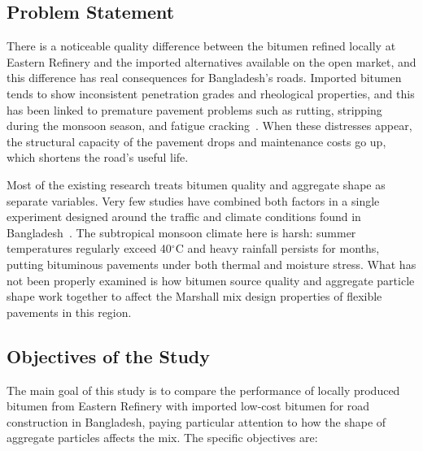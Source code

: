 \documentclass[12pt,a4paper]{article}
\begin{document}
\subsection{Problem Statement}

There is a noticeable quality difference between the bitumen refined locally at Eastern Refinery and the imported alternatives available on the open market, and this difference has real consequences for Bangladesh's roads. Imported bitumen tends to show inconsistent penetration grades and rheological properties, and this has been linked to premature pavement problems such as rutting, stripping during the monsoon season, and fatigue cracking~\cite{khairandish2020influence}. When these distresses appear, the structural capacity of the pavement drops and maintenance costs go up, which shortens the road's useful life.

Most of the existing research treats bitumen quality and aggregate shape as separate variables. Very few studies have combined both factors in a single experiment designed around the traffic and climate conditions found in Bangladesh~\cite{sood2015evaluation}. The subtropical monsoon climate here is harsh: summer temperatures regularly exceed 40$^{\circ}$C and heavy rainfall persists for months, putting bituminous pavements under both thermal and moisture stress. What has not been properly examined is how bitumen source quality and aggregate particle shape work together to affect the Marshall mix design properties of flexible pavements in this region.

\subsection{Objectives of the Study}

The main goal of this study is to compare the performance of locally produced bitumen from Eastern Refinery with imported low-cost bitumen for road construction in Bangladesh, paying particular attention to how the shape of aggregate particles affects the mix. The specific objectives are:
\end{document}

